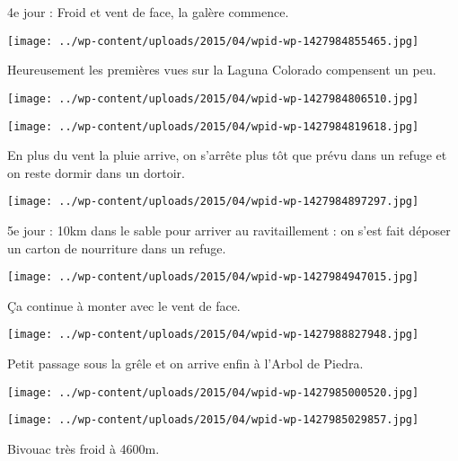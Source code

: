  4e jour : \newline
 Froid et vent de face, la galère commence. \newline
 \newline
\centerline{\texttt{[image: ../wp-content/uploads/2015/04/wpid-wp-1427984855465.jpg]} } 
 \newline
 Heureusement les premières vues sur la Laguna Colorado compensent un peu. \newline
 \newline
\centerline{\texttt{[image: ../wp-content/uploads/2015/04/wpid-wp-1427984806510.jpg]} } 
 \newline
 \newline
\centerline{\texttt{[image: ../wp-content/uploads/2015/04/wpid-wp-1427984819618.jpg]} } 
 \newline
 En plus du vent la pluie arrive, on s'arrête plus tôt que prévu dans un refuge et on reste dormir dans un dortoir. \newline
 \newline
\centerline{\texttt{[image: ../wp-content/uploads/2015/04/wpid-wp-1427984897297.jpg]} } 
 \newline
 5e jour : \newline
 10km dans le sable pour arriver au ravitaillement : on s'est fait déposer un carton de nourriture dans un refuge. \newline
 \newline
\centerline{\texttt{[image: ../wp-content/uploads/2015/04/wpid-wp-1427984947015.jpg]} } 
 \newline
 Ça continue à monter avec le vent de face. \newline
 \newline
\centerline{\texttt{[image: ../wp-content/uploads/2015/04/wpid-wp-1427988827948.jpg]} } 
 \newline
 Petit passage sous la grêle et on arrive enfin à l'Arbol de Piedra. \newline
 \newline
\centerline{\texttt{[image: ../wp-content/uploads/2015/04/wpid-wp-1427985000520.jpg]} } 
 \newline
 \newline
\centerline{\texttt{[image: ../wp-content/uploads/2015/04/wpid-wp-1427985029857.jpg]} } 
 \newline
 Bivouac très froid à 4600m. \newline
 \newline
